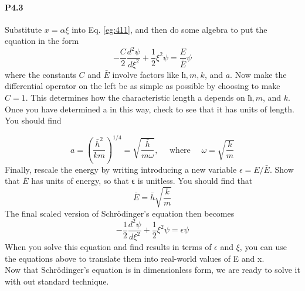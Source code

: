 \documentclass{book}
\theoremstyle{plain}
\theoremstyle{definition}
\numberwithin{exm}{chapter}
\theoremstyle{remark}
\theoremstyle{summary}
\theoremstyle{overview}
\begin{document}
\paragraph*{P4.3}  Substitute $x = \alpha \xi$ into Eq. \eqref{eg:411}, and then do some algebra to put the
equation in the form
\begin{equation}\label{eq:412}
-\frac{C}{2} \frac{d^{2} \psi}{d \xi^{2}}+\frac{1}{2} \xi^{2} \psi=\frac{E}{\bar{E}} \psi
\end{equation}
where the constants $C$ and $\bar{E}$ involve factors like $ħ, m, k$, and $a$.
Now make the differential operator on the left be as simple as possible by
choosing to make $C = 1$. This determines how the characteristic length a
depends on $ħ, m$, and $k$. Once you have determined a in this way, check to
see that it has units of length. You should find

\begin{equation}\label{eq:413}
a=\left(\frac{\bar{h}^{2}}{k m}\right)^{1 / 4}=\sqrt{\frac{\bar{h}}{m \omega}}, \quad \text { where } \quad \omega=\sqrt{\frac{k}{m}}
\end{equation}
Finally, rescale the energy by writing introducing a new variable $	\epsilon = E/\bar{E}$.
Show that $\bar{E}$ has units of energy, so that ϵ is unitless. You should find that
 \begin{equation}\label{eq:414}
\bar{E} = \bar{h}\sqrt{\frac{k}{m}}
\end{equation}
The final scaled version of Schrödinger\rq s equation then becomes
\begin{equation}\label{eq:415}
-\frac{1}{2} \frac{d^{2} \psi}{d \xi^{2}}+\frac{1}{2} \xi^{2} \psi=\epsilon \psi
\end{equation}
When you solve this equation and find results in terms of $\epsilon$ and $\xi$, you can
use the equations above to translate them into real-world values of E and x.\\
Now that Schrödinger\rq s equation is in dimensionless form, we are ready to
solve it with out standard technique.
\end{document}
